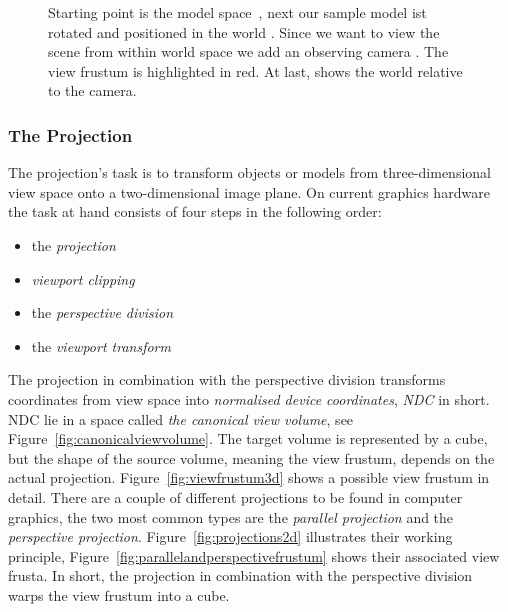 \begin{figure}[t]
{  \label{fig:subfigviewspace}
}
\caption[Model, World and View space]{Starting point is the model
space~, next our sample model ist rotated and
positioned in the world . Since we want to view the
scene from within world space we add an observing camera
. The view frustum is highlighted in
red. At last,  shows the world relative to the
camera.}
\label{fig:ModelWorldView}
\end{figure}

\subsubsection{The Projection}

The projection's task is to transform objects or models from three-dimensional
view space onto a two-dimensional image plane. On current graphics hardware the
task at hand consists of four steps in the following order:
\begin{itemize}
 \item the \textit{projection}
 \item \textit{viewport clipping}
 \item the \textit{perspective division}
 \item the \textit{viewport transform}
\end{itemize}

The projection in combination with the perspective division transforms
coordinates from view space into \textit{normalised device coordinates},
\textit{NDC} in short. NDC lie in a space called \textit{the canonical view
volume}, see Figure~\ref{fig:canonicalviewvolume}. The target volume is
represented by a cube, but the shape of the source volume, meaning the view
frustum, depends on the actual projection. Figure~\ref{fig:viewfrustum3d} shows
a possible view frustum in detail. There are a couple of different projections
to be found in computer graphics, the two most common types are the
\textit{parallel projection} and the \textit{perspective projection}.
Figure~\ref{fig:projections2d} illustrates their working principle,
Figure~\ref{fig:parallelandperspectivefrustum} shows their associated view
frusta. In short, the projection in combination with the perspective division
warps the view frustum into a cube.

